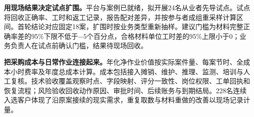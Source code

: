 \documentclass[a4paper,10pt]{article}
\begin{document}
\textbf{用现场结果决定试点扩围。}平台与案例已就绪，拟开展24名从业者先导试点。试点将回收正确率、工时和返工记录，报告配对差异，并按参与者成组重采样计算区间。首轮结论对应固定18案，扩围时按业务类型重新抽样。建议门槛为材料完整正确率差的95\%下限不低于$-5$个百分点，合格材料单位工时差的95\%上限小于0；业务负责人在试点前确认门槛，结果待现场回收。

\textbf{把采购成本与日常作业连接起来。}年化净作业价值按实际案件量、每案节时、全成本小时费率及年度总成本计算。成本包括接入摊销、维护、推理、监测、培训与人工复核。技术验收覆盖观察时点、字段映射、评分一致性、岗位权限、工单回执和恢复流程；风险验收回收动作原因、审批时间、后续账务与到期结局。228名连续入选客户体现了沿原案接续的现实需求，重复取数与材料重做的改善以现场记录计量。
\end{document}
